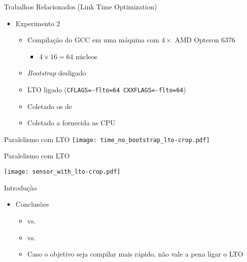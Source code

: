 \begin{frame}{Trabalhos Relacionados (Link Time Optimization)}
    \begin{itemize}
        \item Experimento 2
        \begin{itemize}
            \item Compilação do GCC em uma máquina com $4\times$ AMD Opteron 6376
                \begin{itemize}
                    \item $4 \times 16 = 64$ núcleos
                \end{itemize}
            \item \textit{Bootstrap} desligado
            \item LTO ligado (\texttt{CFLAGS=-flto=64 CXXFLAGS=-flto=64})
            \item Coletado os {\color{blue}{tempos de compilação}} de {\color{red}{cada arquivo}}
            \item Coletado a {\color{blue}{soma da potência instantânea}} fornecida as CPU
        \end{itemize}
    \end{itemize}
\end{frame}

\begin{frame}
    Paralelismo com LTO
    \texttt{[image: time\_no\_bootstrap\_lto-crop.pdf]}
    \label{fig:analysis_lto}
\end{frame}

\begin{frame}
    Paralelismo com LTO

    \centering
    \texttt{[image: sensor\_with\_lto-crop.pdf]}
    \label{fig:analysis_lto}
\end{frame}

\begin{frame}{Introdução}
    \begin{itemize}
        \item Conclusões
        \begin{itemize}
            \item {\color{blue}{180s sem LTO}} vs. {\color{red}{300s com LTO}}
            \item {\color{blue}{1.8Wh sem LTO}} vs. {\color{red}{2.7Wh com LTO}}
            \item Caso o objetivo seja compilar mais rápido, não vale a pena ligar o LTO
        \end{itemize}
    \end{itemize}
\end{frame}

